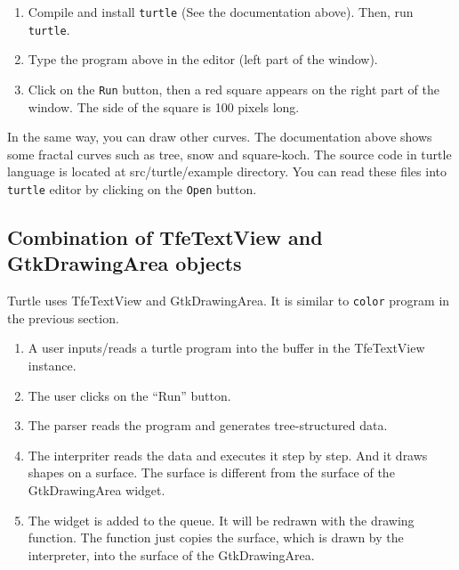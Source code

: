 \begin{enumerate}
\def\labelenumi{\arabic{enumi}.}
\tightlist
\item
  Compile and install \passthrough{\lstinline!turtle!} (See the
  documentation above). Then, run \passthrough{\lstinline!turtle!}.
\item
  Type the program above in the editor (left part of the window).
\item
  Click on the \passthrough{\lstinline!Run!} button, then a red square
  appears on the right part of the window. The side of the square is 100
  pixels long.
\end{enumerate}

In the same way, you can draw other curves. The documentation above
shows some fractal curves such as tree, snow and square-koch. The source
code in turtle language is located at src/turtle/example directory. You
can read these files into \passthrough{\lstinline!turtle!} editor by
clicking on the \passthrough{\lstinline!Open!} button.

\hypertarget{combination-of-tfetextview-and-gtkdrawingarea-objects}{%
\subsection{Combination of TfeTextView and GtkDrawingArea
objects}\label{combination-of-tfetextview-and-gtkdrawingarea-objects}}

Turtle uses TfeTextView and GtkDrawingArea. It is similar to
\passthrough{\lstinline!color!} program in the previous section.

\begin{enumerate}
\def\labelenumi{\arabic{enumi}.}
\tightlist
\item
  A user inputs/reads a turtle program into the buffer in the
  TfeTextView instance.
\item
  The user clicks on the ``Run'' button.
\item
  The parser reads the program and generates tree-structured data.
\item
  The interpriter reads the data and executes it step by step. And it
  draws shapes on a surface. The surface is different from the surface
  of the GtkDrawingArea widget.
\item
  The widget is added to the queue. It will be redrawn with the drawing
  function. The function just copies the surface, which is drawn by the
  interpreter, into the surface of the GtkDrawingArea.
\end{enumerate}

